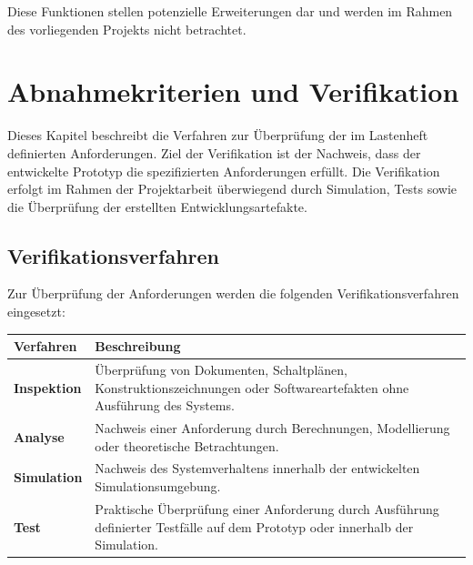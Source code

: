 \documentclass[
  a4paper,
  12pt,
  DIV=12,        %
  parskip=half,  %
  headings=small %
]{scrartcl}
\theoremstyle{definition}
\theoremstyle{definition}
\begin{document}
Diese Funktionen stellen potenzielle Erweiterungen dar und werden im
Rahmen des vorliegenden Projekts nicht betrachtet.

\section{Abnahmekriterien und
Verifikation}\label{abnahmekriterien-und-verifikation}

Dieses Kapitel beschreibt die Verfahren zur Überprüfung der im
Lastenheft definierten Anforderungen. Ziel der Verifikation ist der
Nachweis, dass der entwickelte Prototyp die spezifizierten Anforderungen
erfüllt. Die Verifikation erfolgt im Rahmen der Projektarbeit
überwiegend durch Simulation, Tests sowie die Überprüfung der erstellten
Entwicklungsartefakte.

\subsection{Verifikationsverfahren}\label{verifikationsverfahren}

Zur Überprüfung der Anforderungen werden die folgenden
Verifikationsverfahren eingesetzt:

\begin{longtable}[]{@{}
  >{\raggedright\arraybackslash}p{}
  >{\raggedright\arraybackslash}p{}@{}}
\toprule\noalign{}
\begin{minipage}[b]{\linewidth}\raggedright
Verfahren
\end{minipage} & \begin{minipage}[b]{\linewidth}\raggedright
Beschreibung
\end{minipage} \\
\midrule\noalign{}
\endhead
\bottomrule\noalign{}
\endlastfoot
\textbf{Inspektion} & Überprüfung von Dokumenten, Schaltplänen,
Konstruktionszeichnungen oder Softwareartefakten ohne Ausführung des
Systems. \\
\textbf{Analyse} & Nachweis einer Anforderung durch Berechnungen,
Modellierung oder theoretische Betrachtungen. \\
\textbf{Simulation} & Nachweis des Systemverhaltens innerhalb der
entwickelten Simulationsumgebung. \\
\textbf{Test} & Praktische Überprüfung einer Anforderung durch
Ausführung definierter Testfälle auf dem Prototyp oder innerhalb der
Simulation. \\
\end{longtable}
\end{document}
